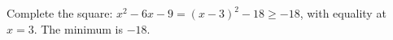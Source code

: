 Complete the square: $x^2-6x-9=(x-3)^2-18\ge-18$, with equality at $x=3$. The minimum is $\boxed{-18}$.
